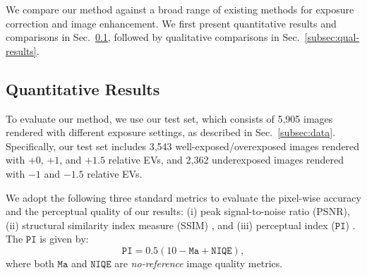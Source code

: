 \documentclass[final]{cvpr}
\begin{document}
We compare our method against a broad range of existing methods for exposure correction and image enhancement. We first present quantitative results and comparisons in Sec.\ \ref{subsec:quan-results}, followed by qualitative comparisons in Sec.\ \ref{subsec:qual-results}.








\subsection{Quantitative Results} \label{subsec:quan-results}

To evaluate our method, we use our test set, which consists of 5,905 images rendered with different exposure settings, as described in Sec.\ \ref{subsec:data}. Specifically, our test set includes 3,543 well-exposed/overexposed images rendered with $+0$, $+1$, and $+1.5$ relative EVs, and 2,362 underexposed images rendered with $-1$ and $-1.5$ relative EVs.


We adopt the following three standard metrics to evaluate the pixel-wise accuracy and the perceptual quality of our results: (i)  peak signal-to-noise ratio (PSNR), (ii)  structural similarity index measure (SSIM) \cite{wang2004image}, and (iii)  perceptual index ($\texttt{PI}$) \cite{blau20182018}. The $\texttt{PI}$ is given by:
\begin{equation}
\label{eq:PI}
\texttt{PI} = 0.5 (10 - \texttt{Ma} + \texttt{NIQE}),
\end{equation}
where both $\texttt{Ma}$ \cite{ma2017learning} and $\texttt{NIQE}$  \cite{mittal2012making} are \textit{no-reference} image quality metrics.
\end{document}

